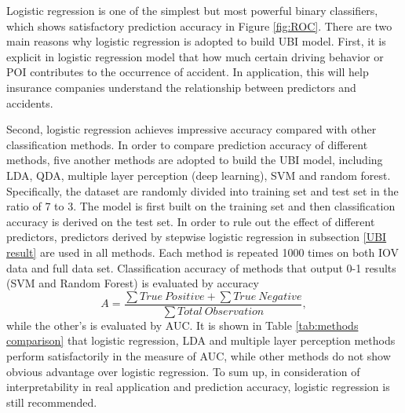 \documentclass[sii]{ipart}
\theoremstyle{plain}
\begin{document}
Logistic regression is one of the simplest but most powerful binary classifiers, which shows satisfactory prediction accuracy in Figure \ref{fig:ROC}.
There are two main reasons why logistic regression is adopted to build UBI model.
First, it is explicit in logistic regression model that how much certain driving behavior or POI contributes to the occurrence of accident. In application, this will help insurance companies understand the relationship between predictors and accidents.

Second, logistic regression achieves impressive accuracy compared with other classification methods.
In order to compare prediction accuracy of different methods, five another methods are adopted to build the UBI model, including LDA, QDA, multiple layer perception (deep learning), SVM and random forest. Specifically, the dataset are randomly divided into training set and test set in the ratio of 7 to 3. The model is first built on the training set and then classification accuracy is derived on the test set.  In order to rule out the effect of different predictors, predictors derived by stepwise logistic regression in subsection \ref{UBI result} are used in all methods. Each method is repeated 1000 times on both IOV data and full data set. Classification accuracy of methods that output 0-1 results (SVM and Random Forest) is evaluated by accuracy
$$A=\frac{\sum True\ Positive + \sum True\ Negative}{\sum Total\ Observation},$$ 
while the other's is evaluated by AUC.
It is shown in Table \ref{tab:methods comparison} that logistic regression, LDA and multiple layer perception methods perform satisfactorily in the measure of AUC, while other methods do not show obvious advantage over logistic regression. To sum up, in consideration of interpretability in real application and prediction accuracy, logistic regression is still recommended.
\end{document}
